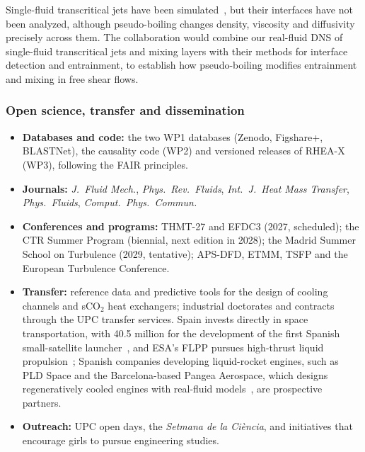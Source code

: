 \documentclass[11pt]{article}
\begin{document}
\begin{itemize}
  Single-fluid transcritical jets have been simulated~\cite{Lapenna2019,Ream2025},
  but their interfaces have not been analyzed, although pseudo-boiling changes density,
  viscosity and diffusivity precisely across them. The collaboration would combine our
  real-fluid DNS of single-fluid transcritical jets and mixing layers with their methods for
  interface detection and entrainment, to establish how pseudo-boiling modifies entrainment
  and mixing in free shear flows.
\end{itemize}

\subsubsection*{Open science, transfer and dissemination}
\begin{itemize}
  \item \textbf{Databases and code:} the two WP1 databases (Zenodo, Figshare+, BLASTNet), the
  causality code (WP2) and versioned releases of RHEA-X (WP3), following the FAIR principles.
  \item \textbf{Journals:} \emph{J.\ Fluid Mech.}, \emph{Phys.\ Rev.\ Fluids}, \emph{Int.\ J.\
  Heat Mass Transfer}, \emph{Phys.\ Fluids}, \emph{Comput.\ Phys.\ Commun.}
  \item \textbf{Conferences and programs:} THMT-27 and EFDC3 (2027, scheduled); the CTR Summer
  Program (biennial, next edition in 2028); the Madrid Summer School on Turbulence (2029,
  tentative); APS-DFD, ETMM, TSFP and the European Turbulence Conference.
  \item \textbf{Transfer:} reference data and predictive tools for the design of cooling
  channels and sCO$_2$ heat exchangers; industrial doctorates and contracts through the UPC
  transfer services. Spain invests directly in space transportation, with \texteuro{}40.5
  million for the development of the first Spanish small-satellite launcher~\cite{CDTI2024},
  and ESA's FLPP pursues high-thrust liquid propulsion~\cite{ESA2026}; Spanish companies
  developing liquid-rocket engines, such as PLD Space and the Barcelona-based Pangea Aerospace,
  which designs regeneratively cooled engines with real-fluid models~\cite{Esnault2021}, are
  prospective partners.
  \item \textbf{Outreach:} UPC open days, the \emph{Setmana de la Ci\`encia}, and initiatives
  that encourage girls to pursue engineering studies.
\end{itemize}
\end{document}
